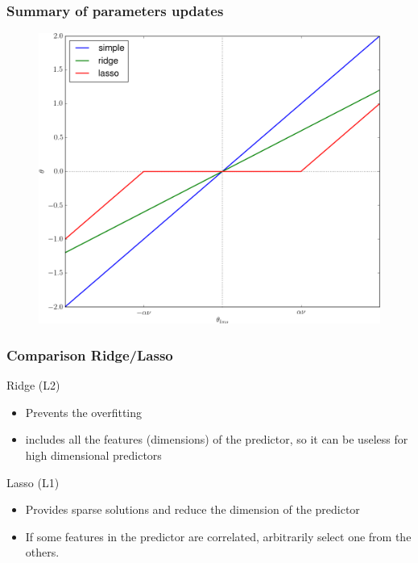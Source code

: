 \documentclass[handout]{beamer}
\begin{document}
\begin{frame}
\frametitle{Summary of parameters updates}
\begin{figure}
\includegraphics[height=0.8\textheight]{./fig/L1/updates.png}
\end{figure}
\end{frame}

\begin{frame}
\frametitle{Comparison Ridge/Lasso}
\begin{exampleblock}{Ridge (L2)}
\begin{itemize}
\item Prevents the overfitting
\item includes all the features (dimensions) of the predictor, 
so it can be useless for high dimensional predictors
\end{itemize}
\end{exampleblock}
\pause
\begin{alertblock}{Lasso (L1)}
\begin{itemize}
\item Provides sparse solutions and reduce the dimension of the
predictor
\item If some features in the predictor are correlated, arbitrarily select
one from the others.
\end{itemize}
\end{alertblock}
\end{frame}
\end{document}
